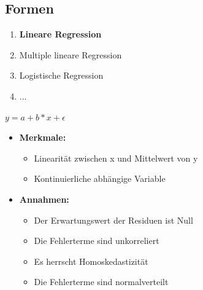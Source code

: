 \documentclass[aspectratio=169, journal, x11names, unknownkeysallowed, hyperref={colorlinks,
linkcolor = SS2,
urlcolor  = F3,
citecolor = F3,
anchorcolor = A4}, 12pt]{beamer}
\begin{document}
  \subsection{Formen}
    \begin{frame}[t]
      \begin{minipage}{0.45\textwidth}
        \vspace{1em}
        \begin{enumerate}
          \item \textbf{Lineare Regression}
          \item Multiple lineare Regression
          \item Logistische Regression
          \item ...
        \end{enumerate}
    \end{minipage}%
    \begin{minipage}[t]{0.45\textwidth}
      \begin{tcolorbox}
        \begin{center}
          $y = a + b * x + \epsilon$
        \end{center}
      \end{tcolorbox}
      \begin{itemize}
        \item[] \textbf{Merkmale:}
        \begin{itemize} 
          \item Linearität zwischen x und Mittelwert von y
          \item Kontinuierliche abhängige Variable
        \end{itemize}
        \item[] \textbf{Annahmen:}
        \begin{itemize} 
          \footnotesize
          \item Der Erwartungswert der Residuen ist Null 
          \item Die Fehlerterme sind unkorreliert
          \item Es herrscht Homoskedastizität
          \item Die Fehlerterme sind normalverteilt
        \end{itemize}
      \end{itemize}
    \end{minipage}
    \end{frame}
\end{document}
